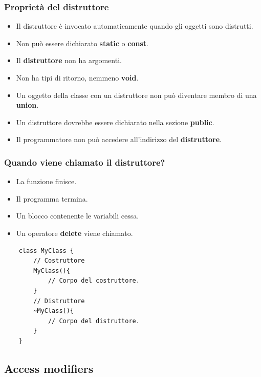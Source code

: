 \subsubsection{Proprietà del distruttore}

\begin{itemize}
	\item \textsf{\small Il distruttore è invocato automaticamente quando gli oggetti sono distrutti.}
	\item \textsf{\small Non può essere dichiarato \textbf{static} o \textbf{const}.}
	\item \textsf{\small Il \textbf{distruttore} non ha argomenti.}
	\item \textsf{\small Non ha tipi di ritorno, nemmeno \textbf{void}.}
	\item \textsf{\small Un oggetto della classe con un distruttore non può diventare membro di una \textbf{union}.}
	\item \textsf{\small Un distruttore dovrebbe essere dichiarato nella sezione \textbf{public}.}
	\item \textsf{\small Il programmatore non può accedere all'indirizzo del \textbf{distruttore}.}
\end{itemize}

\subsubsection{Quando viene chiamato il distruttore?}

\begin{itemize}
	\item \textsf{\small La funzione finisce.}
	\item \textsf{\small Il programma termina.}
	\item \textsf{\small Un blocco contenente le variabili cessa.}
	\item \textsf{\small Un operatore \textbf{delete} viene chiamato.}
\end{itemize}

\begin{lstlisting}
	class MyClass {
		// Costruttore
		MyClass(){
			// Corpo del costruttore.
		}
		// Distruttore
		~MyClass(){
			// Corpo del distruttore.
		}
	}
\end{lstlisting}

\subsection{Access modifiers}

